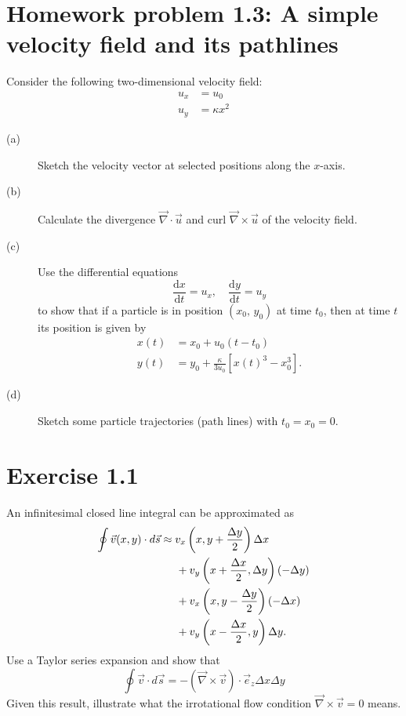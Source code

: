 \documentclass[a4paper, 10pt]{article}
\begin{document}
\section*{Homework problem 1.3: A simple velocity field and its pathlines}
Consider the following two-dimensional velocity field:
\begin{align}
	u_x &= u_0\\
	u_y &= \kappa x^2
\end{align}

\begin{description}
	\item[(a)]
	Sketch the velocity vector at selected positions along the $x$-axis.
	
	\item[(b)]
	Calculate the divergence $\vec{\nabla}\cdot\vec{u}$ and curl $\vec{\nabla}\times \vec{u}$ of the velocity field.
	
	\item[(c)]
	Use the differential equations
	\begin{equation}
		\frac{\mathrm{d}x}{\mathrm{d}t} = u_x, \quad \frac{\mathrm{d}y}{\mathrm{d}t} = u_y
	\end{equation}
	to show that if a particle is in position $(x_0,\, y_0)$ at time $t_0$, then at time $t$ its position is given by
	\begin{align}
		x(t) &= x_0 + u_0(t-t_0)\\
		y(t) &= y_0 + \frac{\kappa}{3u_0}\left[x(t)^3 - x_0^3\right].
	\end{align}
	
	\item[(d)]
	Sketch some particle trajectories (path lines) with $t_0=x_0=0$.
\end{description}

\section*{Exercise 1.1}
An infinitesimal closed line integral can be approximated as
\begin{align}
	\begin{split}
		\oint\vec{v}(x,y)\cdot d\vec{s} &\approx v_x\left(x,y+\frac{\Delta y}{2}\right)\Delta x \\
		&\hspace{5mm}+ v_y \left(x+\frac{\Delta x}{2}, \Delta y\right)(-\Delta y)\\
		&\hspace{5mm}+ v_x \left(x, y-\frac{\Delta y}{2}\right)(-\Delta x)\\
		&\hspace{5mm}+ v_y \left(x-\frac{\Delta x}{2}, y\right) \Delta y.
	\end{split}
\end{align}
Use a Taylor series expansion and show that
\begin{equation}
	\oint \vec{v}\cdot d\vec{s} = - \left(\vec{\nabla}\times\vec{v}\right)\cdot\vec{e}_z \Delta x \Delta y
\end{equation}
Given this result, illustrate what the irrotational flow condition $\vec{\nabla}\times\vec{v}=0$ means.
\end{document}
